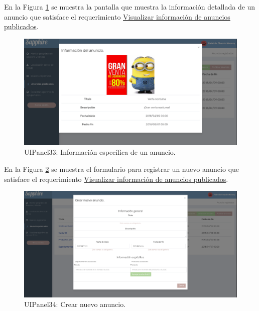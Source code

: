 En la Figura \ref{PA:anunciospublicados2} se muestra la pantalla que muestra la información detallada de un anuncio que satisface el requerimiento \hyperlink{RFPA}{Visualizar información de anuncios publicados}.
\FloatBarrier
\begin{figure}[htbp!]
		\centering
			\includegraphics[width=1 \textwidth]{imagenes/UI/prototipo3/anunciosregistrados2}
		\caption{UIPanel33: Información específica de un anuncio.}
		\label{PA:anunciospublicados2}
\end{figure}
\FloatBarrier


En la Figura \ref{PA:anunciospublicados3} se muestra el formulario para registrar un nuevo anuncio que satisface el requerimiento \hyperlink{RFPA}{Visualizar información de anuncios publicados}.
\FloatBarrier
\begin{figure}[htbp!]
		\centering
			\includegraphics[width=1 \textwidth]{imagenes/UI/prototipo3/anunciosregistrados3}
		\caption{UIPanel34: Crear nuevo anuncio.}
		\label{PA:anunciospublicados3}
\end{figure}
\FloatBarrier




